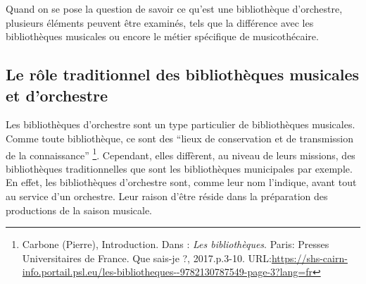 Quand on se pose la question de savoir ce qu'est une bibliothèque d'orchestre, plusieurs éléments peuvent être examinés, tels que la différence avec les bibliothèques musicales ou encore le métier spécifique de musicothécaire.

\subsection*{Le rôle traditionnel des bibliothèques musicales et d'orchestre} %
Les bibliothèques d'orchestre sont un type particulier de bibliothèques musicales. Comme toute bibliothèque, ce sont des \enquote{lieux de conservation et de transmission de la connaissance}%
\footnote{Carbone (Pierre), Introduction. Dans : \textit{Les bibliothèques}. %
Paris: Presses Universitaires de France. Que sais-je ?, 2017.p.3-10.
URL:\url{https://shs-cairn-info.portail.psl.eu/les-bibliotheques--9782130787549-page-3?lang=fr}}. %
Cependant, elles diffèrent, au niveau de leurs missions, des bibliothèques traditionnelles que sont les bibliothèques municipales par exemple.
En effet, les bibliothèques d'orchestre sont, comme leur nom l'indique, avant tout au service d'un orchestre. Leur raison d'être réside dans la préparation des productions de la saison musicale. 

